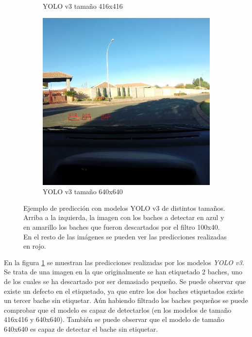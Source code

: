 \begin{figure}[H]
\begin{subfigure}[h]{0.45\linewidth}
		\caption{YOLO v3 tamaño 416x416}
	\end{subfigure}
	\begin{subfigure}[h]{0.45\linewidth}
		\includegraphics[width=\linewidth]{images/results_a_yolo_v3_640.jpg}
		\caption{YOLO v3 tamaño 640x640}
	\end{subfigure}
	\caption{Ejemplo de predicción con modelos YOLO v3 de distintos tamaños. Arriba a la izquierda, la imagen con los baches a detectar en azul y en amarillo los baches que fueron descartados por el filtro 100x40. En el resto de las imágenes se pueden ver las predicciones realizadas en rojo.}
	\label{fig:resultsav3}
\end{figure}

En la figura \ref{fig:resultsav3} se muestran las predicciones realizadas por los modelos \textit{YOLO v3}. Se trata de una imagen en la que originalmente se han etiquetado 2 baches, uno de los cuales se ha descartado por ser demasiado pequeño. Se puede observar que existe un defecto en el etiquetado, ya que entre los dos baches etiquetados existe un tercer bache sin etiquetar. Aún habiendo filtrado los baches pequeños se puede comprobar que el modelo es capaz de detectarlos (en los modelos de tamaño 416x416 y 640x640). También se puede observar que el modelo de tamaño 640x640 es capaz de detectar el bache sin etiquetar.

